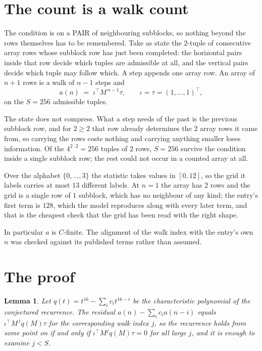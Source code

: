 \documentclass[11pt,a4paper]{article}
\theoremstyle{plain}
\newtheorem{lemma}[theorem]{Lemma}
\theoremstyle{definition}
\begin{document}
\section{The count is a walk count}

The condition is on a PAIR of neighbouring subblocks, so nothing beyond the
rows themselves has to be remembered. Take as state the $2$-tuple of consecutive array rows
whose subblock row has just been completed: the horizontal pairs inside that row decide which
tuples are admissible at all, and the vertical pairs decide which tuple may follow which. A
step appends one array row. An array of $n+1$ rows is a walk of $n-1$ steps and
\[
a(n)\;=\;\iota^{\!\top}M^{\,n-1}\tau,\qquad\iota=\tau=(1,\dots,1)^{\!\top},
\]
on the $S=256$ admissible tuples.

The state does not compress. What a step needs of the past is the previous subblock row, and
for $2\ge2$ that row already determines the $2$ array rows it came from, so carrying the
rows costs nothing and carrying anything smaller loses information. Of the $4^{2\cdot
2}=256$ tuples of $2$ rows, $S=256$ survive the condition inside a single subblock row;
the rest could not occur in a counted array at all.

Over the alphabet $\{0,\dots,3\}$ the statistic takes values in $[0,12]$, so the
grid it labels carries at most $13$ different labels. At $n=1$ the array has $2$
rows and the grid is a single row of $1$
subblock, which has no neighbour of any kind; the entry's first term is
$128$, which the model reproduces along with every later term, and that is the cheapest
check that the grid has been read with the right shape.

In particular $a$ is $C$-finite. The alignment of the walk index with the entry's own $n$ was
checked against its published terms rather than assumed.

\section{The proof}

\begin{lemma}\label{lem:crit}
Let $q(t)=t^{16}-\sum_i c_it^{16-i}$ be the characteristic polynomial of the
conjectured recurrence. The residual $a(n)-\sum_ic_ia(n-i)$ equals
$\iota^{\!\top}M^{\,j}q(M)\tau$ for the corresponding walk index $j$, so the recurrence
holds from some point on if and only if $\iota^{\!\top}M^{j}q(M)\tau=0$ for all large $j$,
and it is enough to examine $j<S$.
\end{lemma}
\end{document}
